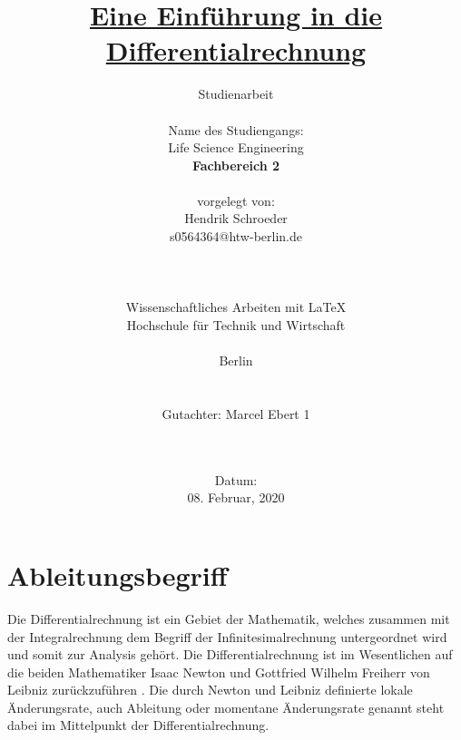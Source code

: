\documentclass[11pt, a4paper]{report}
\begin{document}
\title{ \underline{Eine Einführung in die Differentialrechnung}}
\author{Studienarbeit\\
  \\
  Name des Studiengangs:\\
  \Large Life Science Engineering\\  
  \Large \textbf{Fachbereich 2}  
  \\
  \\  
  vorgelegt von:\\
  \Large Hendrik Schroeder\\
  s0564364@htw-berlin.de\\
  \\ 
  \\
  \\
  \Large Wissenschaftliches Arbeiten mit \LaTeX{}\\
  Hochschule für Technik und Wirtschaft\\
  \\
  Berlin
  \\
  \\
  \\
  Gutachter: Marcel Ebert 1
  \\
  \\
  \\}
  \date{Datum:\\
  08. Februar, 2020}
\maketitle

\setcounter{tocdepth}{2}
\tableofcontents
\clearpage

\listoffigures
{}
\clearpage

\listoftables
{}
\clearpage

\chapter{Ableitungsbegriff}
Die Differentialrechnung ist ein Gebiet der Mathematik, welches zusammen mit der Integralrechnung dem Begriff der Infinitesimalrechnung untergeordnet wird und somit zur Analysis gehört. Die Differentialrechnung ist im Wesentlichen auf die beiden Mathematiker Isaac Newton und Gottfried Wilhelm Freiherr von Leibniz zurückzuführen \cite[Seite 188]{Wendland.2005}. Die durch Newton und Leibniz definierte lokale Änderungsrate, auch Ableitung oder momentane Änderungsrate genannt steht dabei im Mittelpunkt der Differentialrechnung.
\end{document}
